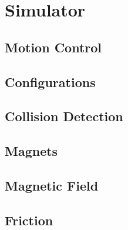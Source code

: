 \chapter{Simulator}
\label{chap:sim}




\section{Motion Control}


\section{Configurations}


\section{Collision Detection}


\section{Magnets}


\section{Magnetic Field}



\section{Friction}



